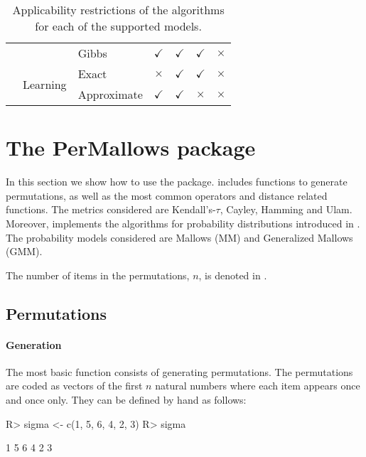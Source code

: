 \documentclass[article,nojss]{jss}
\begin{document}
\begin{table}[h]
\begin{tabular}{lllcccc}
                     &                           	& Gibbs       	& $\checkmark$                	& $\checkmark$               & $\checkmark$                	&$\times$           \\
                      \cline{2-7}
                      & \multirow{2}{*}{Learning} 
                      				& Exact      	&$\times$                   		& $\checkmark$               & $\checkmark$                	&$\times$            \\
                     &                           	& Approximate & $\checkmark$                	& $\checkmark$               & $\times$                	&$\times$          \\
\hline \hline
\end{tabular}
\caption{Applicability restrictions of the algorithms for each of the supported models.}
\label{tab:restrictions}
\end{table}



\section{The PerMallows package}
\label{sec:usage}





In this section we show how to use the  package.  includes functions to generate permutations, as well as the most common operators and distance related functions. The metrics considered are Kendall's-$\tau$, Cayley, Hamming and Ulam. Moreover,  implements the algorithms for probability distributions introduced in \cite{Irurozki2014,Irurozki2014a,Irurozki2014b}. The probability models considered are Mallows (MM) and Generalized Mallows (GMM).

The number of items in the permutations, $n$, is denoted  in .

\subsection{Permutations}
\paragraph*{Generation}
The most basic function consists of generating permutations. The permutations are coded as vectors of the first $n$ natural numbers where each item appears once and once only. They can be defined by hand as follows:
\begin{Schunk}
\begin{Sinput}
R> sigma <- c(1, 5, 6, 4, 2, 3)
R> sigma
\end{Sinput}
\begin{Soutput}
[1] 1 5 6 4 2 3
\end{Soutput}
\end{Schunk}
\end{document}
